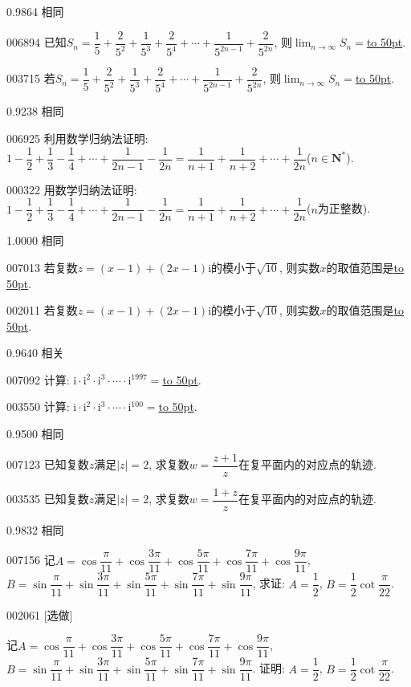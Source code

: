 \documentclass[10pt,a4paper]{article}
\newcommand{\blank}[1]{\underline{\hbox to #1pt{}}}
\begin{document}
0.9864 相同

006894	已知$S_n=\dfrac 15+\dfrac 2{5^2}+\dfrac 1{5^3}+\dfrac 2{5^4}+\cdots +\dfrac 1{5^{2n-1}}+\dfrac 2{5^{2n}}$, 则$\displaystyle \lim_{n\to \infty} S_n=$\blank{50}.

003715	若$S_n=\dfrac 15+\dfrac {2}{5^2}+\dfrac {1}{5^3}+\dfrac{2}{5^4}+\cdots+\dfrac{1}{5^{2n-1}}+\dfrac{2}{5^{2n}}$, 则$\displaystyle\lim_{n\to \infty}S_n=$\blank{50}.



0.9238 相同

006925	利用数学归纳法证明: $1-\dfrac 12+\dfrac 13-\dfrac 14+\cdots +\dfrac 1{2n-1}-\dfrac 1{2n}=\dfrac 1{n+1}+\dfrac 1{n+2}+\cdots +\dfrac 1{2n}$($n\in \mathbf{N}^*$).

000322	用数学归纳法证明: $1-\dfrac12+\dfrac 13-\dfrac 14+\cdots +\dfrac{1}{2n-1}-\dfrac{1}{2n}=\dfrac{1}{n+1}+\dfrac{1}{n+2}+\cdots+\dfrac{1}{2n}$($n$为正整数).



1.0000 相同

007013	若复数$z=(x-1)+(2x-1)\mathrm{i}$的模小于$\sqrt {10}$, 则实数$x$的取值范围是\blank{50}.

002011	若复数$z=(x-1)+(2x-1)\mathrm{i}$的模小于$\sqrt{10}$, 则实数$x$的取值范围是\blank{50}.



0.9640 相关

007092	计算: $\mathrm{i}\cdot \mathrm{i}^2\cdot \mathrm{i}^3\cdot \cdots \cdot \mathrm{i}^{1997}=$\blank{50}.

003550	计算: $\mathrm{i}\cdot\mathrm{i}^2\cdot\mathrm{i}^3\cdot \cdots \cdot \mathrm{i}^{100}=$\blank{50}.



0.9500 相同

007123	已知复数$z$满足$|z|=2$, 求复数$w =\dfrac{z+1}z$在复平面内的对应点的轨迹.

003535	已知复数$z$满足$|z|=2$, 求复数$w=\dfrac{1+z}z$在复平面内的对应点的轨迹.



0.9832 相同

007156	记$A=\cos \dfrac{\pi }{11}+\cos \dfrac{3\pi }{11}+\cos \dfrac{5\pi }{11}+\cos \dfrac{7\pi }{11}+\cos \dfrac{9\pi }{11}$, $B=\sin \dfrac{\pi }{11}+\sin \dfrac{3\pi }{11}+\sin \dfrac{5\pi }{11}+\sin \dfrac{7\pi }{11}+\sin \dfrac{9\pi }{11}$, 求证: $A=\dfrac 12$, $B=\dfrac 12\cot \dfrac{\pi }{22}$.

002061	[选做]

记$A=\cos\dfrac{\pi}{11}+\cos\dfrac{3\pi}{11}+\cos\dfrac{5\pi}{11}+\cos\dfrac{7\pi}{11}+\cos\dfrac{9\pi}{11}$, $B=\sin\dfrac{\pi}{11}+\sin\dfrac{3\pi}{11}+\sin\dfrac{5\pi}{11}+\sin\dfrac{7\pi}{11}+\sin\dfrac{9\pi}{11}$. 证明: $A=\dfrac{1}{2}$, $B=\dfrac{1}{2}\cot\dfrac{\pi}{22}$.
\end{document}
